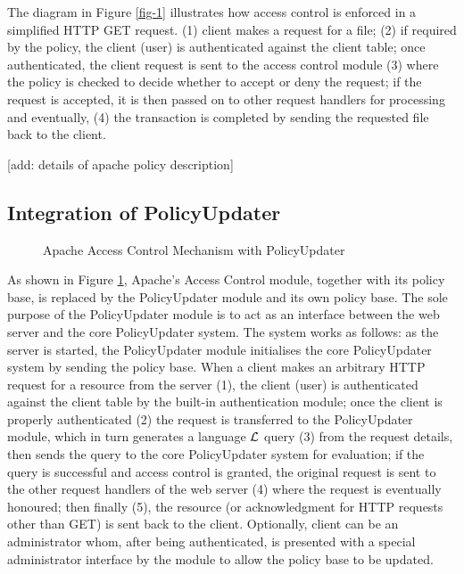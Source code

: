 \documentclass[11pt]{llncs}
\begin{document}
    The diagram in Figure \ref{fig-1} illustrates how access control is
    enforced in a simplified HTTP GET request. (1) client makes a request for a
    file; (2) if required by the policy, the client (user) is authenticated
    against the client table; once authenticated, the client request is sent
    to the access control module (3) where the policy is checked to decide
    whether to accept or deny the request; if the request is accepted, it is
    then passed on to other request handlers for processing and eventually,
    (4) the transaction is completed by sending the requested file back to
    the client.

    [add: details of apache policy description]

    \subsection{Integration of PolicyUpdater}

      \begin{figure}[ht]
        \begin{center}
          \caption{Apache Access Control Mechanism with PolicyUpdater}
          \label{fig-2}
        \end{center}
      \end{figure}

      As shown in Figure \ref{fig-2}, Apache's Access Control module, together
      with its policy base, is replaced by the PolicyUpdater module and its own
      policy base. The sole purpose of the PolicyUpdater module is to act as an
      interface between the web server and the core PolicyUpdater system. The
      system works as follows: as the server is started, the PolicyUpdater
      module initialises the core PolicyUpdater system by sending the policy
      base. When a client makes an arbitrary HTTP request for a resource from
      the server (1), the client (user) is authenticated against the client
      table by the built-in authentication module; once the client is properly
      authenticated (2) the request is transferred to the PolicyUpdater module,
      which in turn generates a language ${\cal L}$ query (3) from the request
      details, then sends the query to the core PolicyUpdater system for
      evaluation; if the query is successful and access control is granted,
      the original request is sent to the other request handlers of the web
      server (4) where the request is eventually honoured; then finally (5),
      the resource (or acknowledgment for HTTP requests other than GET) is sent
      back to the client. Optionally, client can be an administrator whom,
      after being authenticated, is presented with a special administrator
      interface by the module to allow the policy base to be updated.
\end{document}
